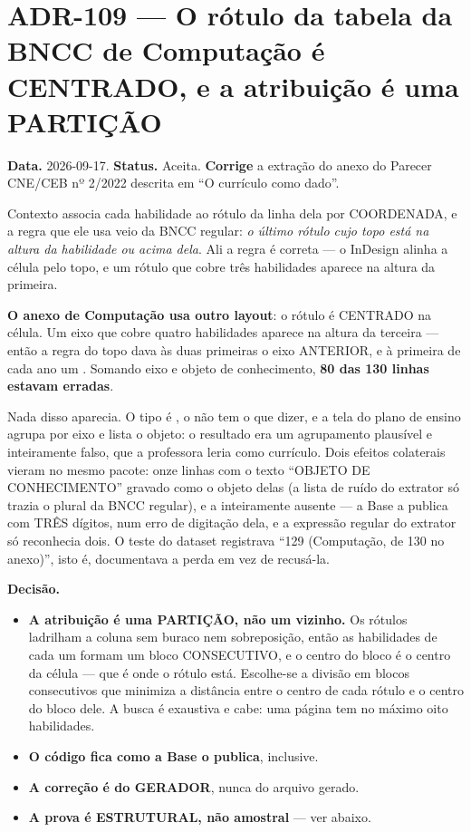 \section{ADR-109 --- O rótulo da tabela da BNCC de Computação é CENTRADO, e a atribuição é uma PARTIÇÃO}
\label{adr:bncc-computacao-geometria}

\textbf{Data.} 2026-09-17. \textbf{Status.} Aceita.
\textbf{Corrige} a extração do anexo do Parecer CNE/CEB nº 2/2022 descrita em
\enquote{O currículo como dado}.

\begin{especificacao}{Contexto}
 associa cada habilidade ao rótulo da linha dela
por COORDENADA, e a regra que ele usa veio da BNCC regular: \emph{o último
rótulo cujo topo está na altura da habilidade ou acima dela}. Ali a regra é
correta --- o InDesign alinha a célula pelo topo, e um rótulo que cobre três
habilidades aparece na altura da primeira.

\textbf{O anexo de Computação usa outro layout}: o rótulo é CENTRADO na célula.
Um eixo que cobre quatro habilidades aparece na altura da terceira --- então a
regra do topo dava às duas primeiras o eixo ANTERIOR, e à primeira de cada ano
um . Somando eixo e objeto de conhecimento, \textbf{80 das 130 linhas
estavam erradas}.

Nada disso aparecia. O tipo é , o  não tem o que
dizer, e a tela do plano de ensino agrupa por eixo e lista o objeto: o
resultado era um agrupamento plausível e inteiramente falso, que a professora
leria como currículo. Dois efeitos colaterais vieram no mesmo pacote: onze
linhas com o texto \enquote{OBJETO DE CONHECIMENTO} gravado como o objeto delas
(a lista de ruído do extrator só trazia o plural da BNCC regular), e a
 inteiramente ausente --- a Base a publica com TRÊS dígitos, num
erro de digitação dela, e a expressão regular do extrator só reconhecia dois.
O teste do dataset registrava \enquote{129 (Computação, de 130 no anexo)}, isto
é, documentava a perda em vez de recusá-la.
\end{especificacao}

\textbf{Decisão.}

\begin{itemize}
  \item \textbf{A atribuição é uma PARTIÇÃO, não um vizinho.} Os rótulos
    ladrilham a coluna sem buraco nem sobreposição, então as habilidades de cada
    um formam um bloco CONSECUTIVO, e o centro do bloco é o centro da célula ---
    que é onde o rótulo está. Escolhe-se a divisão em blocos consecutivos que
    minimiza a distância entre o centro de cada rótulo e o centro do bloco dele.
    A busca é exaustiva e cabe: uma página tem no máximo oito habilidades.
  \item \textbf{O código fica como a Base o publica},  inclusive.
  \item \textbf{A correção é do GERADOR}, nunca do arquivo gerado.
  \item \textbf{A prova é ESTRUTURAL, não amostral} --- ver abaixo.
\end{itemize}

